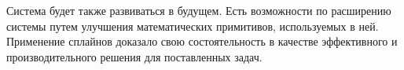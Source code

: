 Система будет также развиваться в будущем. 
Есть возможности по расширению системы путем улучшения математических примитивов, используемых в ней.  
Применение сплайнов доказало свою состоятельность в качестве эффективного и производительного решения для поставленных задач.








\clearpage
